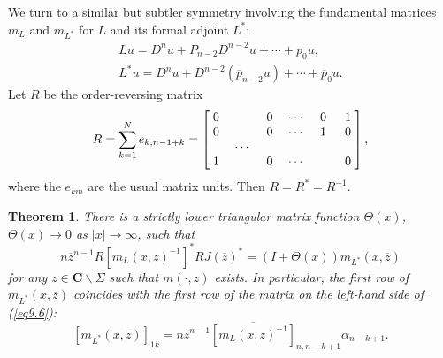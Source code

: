 \documentclass{surv-l}
\theoremstyle{plain}
\newtheorem{theorem}{Theorem}[section]
\theoremstyle{definition}
\numberwithin{equation}{chapter}
\begin{document}
We turn to a similar but subtler symmetry involving the fundamental matrices $m_{L}$ and $m_{L^{*}}$ for $L$ and its formal adjoint $L^{*}$:
\begin{align*}
Lu=D^{n}u + P_{n-2}D^{n-2}u +\cdots +p_{0}u,\\
L^{*}u=D^{n}u+D^{n-2}(\overline{p}_{n-2}u)+\cdots +\overline{p}_{0}u.
\end{align*}
Let $R$ be the order-reversing matrix
\begin{align*}
R = \sum_{k=1}^{N}e_{k,n-1+k}=
\left[\begin{array}{@{}cccccc@{}}
 0 & \quad & 0 & \cdots & 0 & 1\\
 0 & \quad & 0 & \cdots & 1 & 0\\
 \quad & \cdots & \quad & \quad & \quad & \quad\\
 1 & \quad & 0 & \cdots & \quad & 0\end{array}\right],
\end{align*}
where the $e_{km}$ are the usual matrix units. Then $R=R^{*}=R^{-1}$.

\setcounter{theorem}{4}
\begin{theorem}\label{thm9.5} There is a strictly lower triangular matrix function $\Theta(x)$,
$\Theta(x)\rightarrow 0$ as $|x|\rightarrow\infty$, such that
\setcounter{equation}{5}
\begin{equation}\label{eq9.6}
n\overline{z}^{n-1}R[m_{L}(x,z)^{-1}]^{*}RJ(\overline{z})^{*} = (I + \Theta(x))m_{L^{*}}(x,\overline{z})
\end{equation}
for any $ z\in \mathbf{C}\backslash \Sigma$ such that $m(\cdot, z)$ exists. In particular, the first row of $m_{L^{*}} (x,\overline{z})$ coincides with the first row of the matrix on the left-hand side of \emph{(\ref{eq9.6}):}
\begin{equation}\label{eq9.7}
[m_{L^{*}}(x,\overline{z})]_{1k} = n\overline{z}^{n-1}\overline{[m_{L}(x,z)^{-1}]}_{n,n-k+1}\alpha_{n-k+1}.
\end{equation}
\end{theorem}
\end{document}
